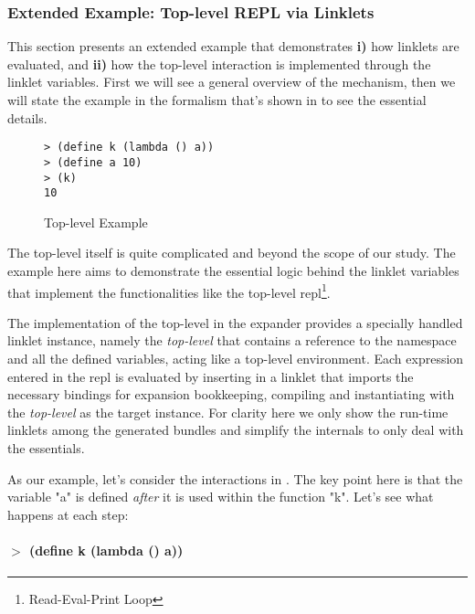 \subsubsection{Extended Example: Top-level REPL via Linklets}
\label{subsec:toplevel-example}

This section presents an extended example that demonstrates
\textbf{i)} how linklets are evaluated, and \textbf{ii)} how the
top-level interaction is implemented through the linklet
variables. First we will see a general overview of the mechanism, then
we will state the example in the formalism that's shown in
 to see the essential details.

\begin{wrapfigure}[9]{r}{0.3\textwidth}
  \begin{mdframed}
    \begin{verbatim}
> (define k (lambda () a))
> (define a 10)
> (k)
10
\end{verbatim}
    \caption{Top-level Example}
    \label{fig:toplevel-interaction}
  \end{mdframed}
\end{wrapfigure}

The top-level itself is quite complicated and beyond the scope of our
study. The example here aims to demonstrate the essential logic behind
the linklet variables that implement the functionalities like the
top-level repl\footnote{Read-Eval-Print Loop}.

The implementation of the top-level in the expander provides a
specially handled linklet instance, namely the \emph{top-level} that
contains a reference to the namespace and all the defined variables,
acting like a top-level environment. Each expression entered in the
repl is evaluated by inserting in a linklet that imports the necessary
bindings for expansion bookkeeping, compiling and instantiating with
the \emph{top-level} as the target instance. For clarity here we only
show the run-time linklets among the generated bundles and simplify
the internals to only deal with the essentials.

As our example, let's consider the interactions in
. The key point here is that the
variable "a" is defined \emph{after} it is used within the function
"k". Let's see what happens at each step:

\paragraph{$>$ (define k (lambda () a))}

